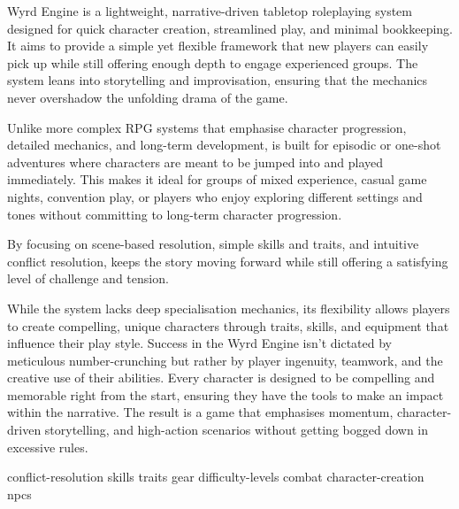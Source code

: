 
 Wyrd Engine is a lightweight, narrative-driven tabletop roleplaying system designed for quick character creation, streamlined play, and minimal bookkeeping. It aims to provide a simple yet flexible framework that new players can easily pick up while still offering enough depth to engage experienced groups. The system leans into storytelling and improvisation, ensuring that the mechanics never overshadow the unfolding drama of the game.

Unlike more complex RPG systems that emphasise character progression, detailed mechanics, and long-term development, \wyrd is built for episodic or one-shot adventures where characters are meant to be jumped into and played immediately. This makes it ideal for groups of mixed experience, casual game nights, convention play, or players who enjoy exploring different settings and tones without committing to long-term character progression.

By focusing on scene-based resolution, simple skills and traits, and intuitive conflict resolution, \wyrd keeps the story moving forward while still offering a satisfying level of challenge and tension.

While the system lacks deep specialisation mechanics, its flexibility allows players to create compelling, unique characters through traits, skills, and equipment that influence their play style. Success in the Wyrd Engine isn’t dictated by meticulous number-crunching but rather by player ingenuity, teamwork, and the creative use of their abilities. Every character is designed to be compelling and memorable right from the start, ensuring they have the tools to make an impact within the narrative. The result is a game that emphasises momentum, character-driven storytelling, and high-action scenarios without getting bogged down in excessive rules.

{conflict-resolution}
{skills}
{traits}
{gear}
{difficulty-levels}
{combat}
{character-creation}
{npcs}

